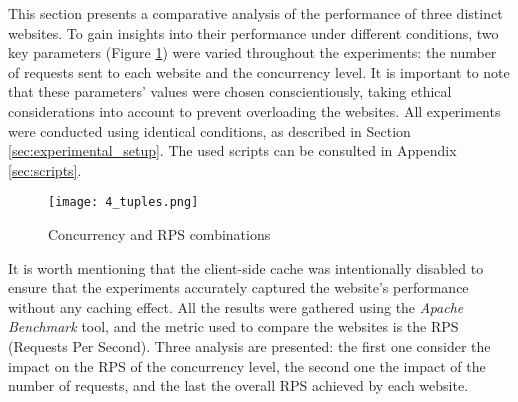 This section presents a comparative analysis of the performance of three distinct websites. To gain insights into their performance under different 
conditions, two key parameters (Figure \ref{fig:4_tuples}) were varied throughout the experiments: the number of requests sent to each website and the concurrency level. 
It is important to note that these parameters' values were chosen conscientiously, taking ethical considerations into account to prevent overloading the websites.
All experiments were conducted using identical conditions, as described in Section \ref{sec:experimental_setup}. The used scripts
can be consulted in Appendix \ref{sec:scripts}.

    \begin{figure}[H]
        \centering
        \texttt{[image: 4\_tuples.png]}
        \caption{\small Concurrency and RPS combinations}
        \label{fig:4_tuples}
    \end{figure}



It is worth mentioning 
that the client-side cache was intentionally disabled to ensure that the experiments accurately captured the website's performance without any caching effect.
All the results were gathered using the \textit{Apache Benchmark} tool, and the metric used to compare the websites is the RPS (Requests Per Second).
Three analysis are presented: the first one consider the impact on the RPS of the concurrency level, the second one the impact of the number of requests,
and the last the overall RPS achieved by each website.

